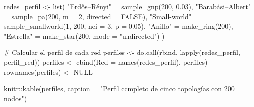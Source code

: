 \documentclass[
  letterpaper,
  DIV=11,
  numbers=noendperiod]{scrreprt}
\newenvironment{Shaded}{\begin{snugshade}}{\end{snugshade}}
\newcommand{\AttributeTok}[1]{\textcolor[rgb]{0.40,0.45,0.13}{#1}}
\newcommand{\CommentTok}[1]{\textcolor[rgb]{0.37,0.37,0.37}{#1}}
\newcommand{\ConstantTok}[1]{\textcolor[rgb]{0.56,0.35,0.01}{#1}}
\newcommand{\DecValTok}[1]{\textcolor[rgb]{0.68,0.00,0.00}{#1}}
\newcommand{\FloatTok}[1]{\textcolor[rgb]{0.68,0.00,0.00}{#1}}
\newcommand{\FunctionTok}[1]{\textcolor[rgb]{0.28,0.35,0.67}{#1}}
\newcommand{\NormalTok}[1]{\textcolor[rgb]{0.00,0.23,0.31}{#1}}
\newcommand{\OtherTok}[1]{\textcolor[rgb]{0.00,0.23,0.31}{#1}}
\newcommand{\SpecialCharTok}[1]{\textcolor[rgb]{0.37,0.37,0.37}{#1}}
\newcommand{\StringTok}[1]{\textcolor[rgb]{0.13,0.47,0.30}{#1}}
\begin{document}
\begin{tcolorbox}
\begin{Shaded}
\begin{Highlighting}[]
\NormalTok{redes\_perfil }\OtherTok{\textless{}{-}} \FunctionTok{list}\NormalTok{(}
  \StringTok{"Erdős–Rényi"}     \OtherTok{=} \FunctionTok{sample\_gnp}\NormalTok{(}\DecValTok{200}\NormalTok{, }\FloatTok{0.03}\NormalTok{),}
  \StringTok{"Barabási–Albert"}  \OtherTok{=} \FunctionTok{sample\_pa}\NormalTok{(}\DecValTok{200}\NormalTok{, }\AttributeTok{m =} \DecValTok{2}\NormalTok{, }\AttributeTok{directed =} \ConstantTok{FALSE}\NormalTok{),}
  \StringTok{"Small{-}world"}      \OtherTok{=} \FunctionTok{sample\_smallworld}\NormalTok{(}\DecValTok{1}\NormalTok{, }\DecValTok{200}\NormalTok{, }\AttributeTok{nei =} \DecValTok{3}\NormalTok{, }\AttributeTok{p =} \FloatTok{0.05}\NormalTok{),}
  \StringTok{"Anillo"}           \OtherTok{=} \FunctionTok{make\_ring}\NormalTok{(}\DecValTok{200}\NormalTok{),}
  \StringTok{"Estrella"}         \OtherTok{=} \FunctionTok{make\_star}\NormalTok{(}\DecValTok{200}\NormalTok{, }\AttributeTok{mode =} \StringTok{"undirected"}\NormalTok{)}
\NormalTok{)}

\CommentTok{\# Calcular el perfil de cada red}
\NormalTok{perfiles }\OtherTok{\textless{}{-}} \FunctionTok{do.call}\NormalTok{(rbind, }\FunctionTok{lapply}\NormalTok{(redes\_perfil, perfil\_red))}
\NormalTok{perfiles }\OtherTok{\textless{}{-}} \FunctionTok{cbind}\NormalTok{(}\AttributeTok{Red =} \FunctionTok{names}\NormalTok{(redes\_perfil), perfiles)}
\FunctionTok{rownames}\NormalTok{(perfiles) }\OtherTok{\textless{}{-}} \ConstantTok{NULL}

\NormalTok{knitr}\SpecialCharTok{::}\FunctionTok{kable}\NormalTok{(perfiles,}
             \AttributeTok{caption =} \StringTok{"Perfil completo de cinco topologías con 200 nodos"}\NormalTok{)}
\end{Highlighting}
\end{Shaded}


\end{tcolorbox}
\end{document}
